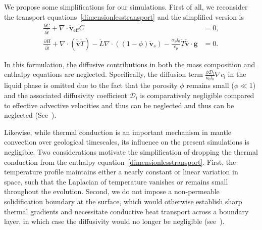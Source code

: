 We propose some simplifications for our simulations.
First of all, we reconsider the transport equations~\eqref{dimensionlesstransport} and 
the simplified version is
\begin{equation}
\label{eq:dlessadvecnodiff}
		  \begin{aligned}
					 \frac{\partial C}{\partial \check{t}} + \nabla \cdot \check{\mathbf{v}}_{\text{eff}} C &= 0,\\
					 \frac{\partial H}{\partial \check{t}} + \nabla \cdot (\check{\overline{\mathbf{v}}} \check{T}) - 
					 \check{L} \nabla \cdot ((1-\phi) \check{\mathbf{v}}_s) -  
					 \frac{\alpha_\rho l_0}{c_p} \check{T} \check{\overline{\mathbf{v}}} \cdot \mathbf{g} &= 0.
		  \end{aligned}
\end{equation}

In this formulation, the diffusive contributions in both the mass composition and enthalpy equations are neglected.
Specifically, the diffusion term $\frac{\phi \mathcal{D}_l}{u_0l_0} \nabla c_l$ in the liquid phase is omitted
due to the fact that the porosity $\phi$ remains small ($\phi \ll 1$) and the associated diffusivity coefficient $\mathcal{D}_l$
is comparatively negligible %
compared to effective advective velocities and thus can be neglected and 
thus can be neglected (See~\cite{GeochemicalConsequence}). 

Likewise, while thermal conduction is an important mechanism in mantle convection over geological timescales, 
its influence on the present simulations is negligible. Two considerations 
motivate the simplification of dropping the thermal conduction from the 
enthalpy equation~\eqref{dimensionlesstransport}. First,
the temperature profile maintains either a nearly constant or linear variation in
space, such that the Laplacian of temperature vanishes or remains small 
throughout the evolution. Second, we do not impose a non-permeable solidification boundary at the surface, 
which would otherwise establish sharp thermal gradients and necessitate conductive heat transport across a boundary layer,
in which case the diffusivity would no longer be negligible (see~\cite{PartialMeltinginUpwellingMantleColumn}). 

